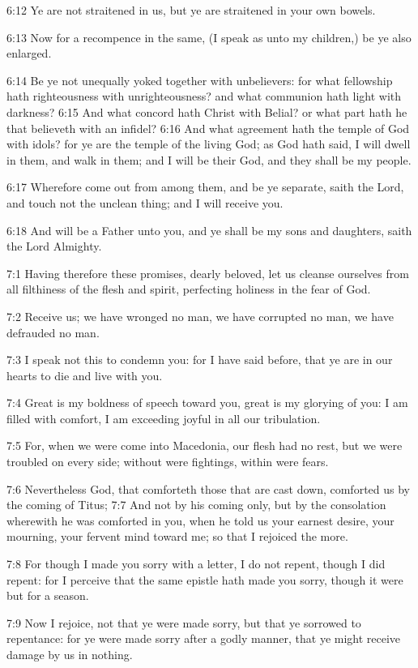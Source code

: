 6:12 Ye are not straitened in us, but ye are straitened in your own
bowels.

6:13 Now for a recompence in the same, (I speak as unto my children,)
be ye also enlarged.

6:14 Be ye not unequally yoked together with unbelievers: for what
fellowship hath righteousness with unrighteousness? and what communion
hath light with darkness?  6:15 And what concord hath Christ with
Belial? or what part hath he that believeth with an infidel?  6:16 And
what agreement hath the temple of God with idols? for ye are the
temple of the living God; as God hath said, I will dwell in them, and
walk in them; and I will be their God, and they shall be my people.

6:17 Wherefore come out from among them, and be ye separate, saith the
Lord, and touch not the unclean thing; and I will receive you.

6:18 And will be a Father unto you, and ye shall be my sons and
daughters, saith the Lord Almighty.

7:1 Having therefore these promises, dearly beloved, let us cleanse
ourselves from all filthiness of the flesh and spirit, perfecting
holiness in the fear of God.

7:2 Receive us; we have wronged no man, we have corrupted no man, we
have defrauded no man.

7:3 I speak not this to condemn you: for I have said before, that ye
are in our hearts to die and live with you.

7:4 Great is my boldness of speech toward you, great is my glorying of
you: I am filled with comfort, I am exceeding joyful in all our
tribulation.

7:5 For, when we were come into Macedonia, our flesh had no rest, but
we were troubled on every side; without were fightings, within were
fears.

7:6 Nevertheless God, that comforteth those that are cast down,
comforted us by the coming of Titus; 7:7 And not by his coming only,
but by the consolation wherewith he was comforted in you, when he told
us your earnest desire, your mourning, your fervent mind toward me; so
that I rejoiced the more.

7:8 For though I made you sorry with a letter, I do not repent, though
I did repent: for I perceive that the same epistle hath made you
sorry, though it were but for a season.

7:9 Now I rejoice, not that ye were made sorry, but that ye sorrowed
to repentance: for ye were made sorry after a godly manner, that ye
might receive damage by us in nothing.

